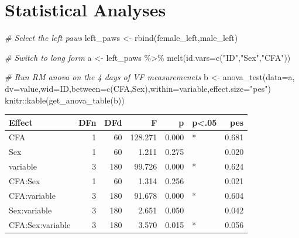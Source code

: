 \documentclass[
]{book}
\newenvironment{Shaded}{\begin{snugshade}}{\end{snugshade}}
\newcommand{\AttributeTok}[1]{\textcolor[rgb]{0.77,0.63,0.00}{#1}}
\newcommand{\CommentTok}[1]{\textcolor[rgb]{0.56,0.35,0.01}{\textit{#1}}}
\newcommand{\FunctionTok}[1]{\textcolor[rgb]{0.00,0.00,0.00}{#1}}
\newcommand{\NormalTok}[1]{#1}
\newcommand{\OtherTok}[1]{\textcolor[rgb]{0.56,0.35,0.01}{#1}}
\newcommand{\SpecialCharTok}[1]{\textcolor[rgb]{0.00,0.00,0.00}{#1}}
\newcommand{\StringTok}[1]{\textcolor[rgb]{0.31,0.60,0.02}{#1}}
\begin{document}
\hypertarget{statistical-analyses-2}{%
\section*{Statistical Analyses}\label{statistical-analyses-2}}

\begin{Shaded}
\begin{Highlighting}[]
\CommentTok{\# Select the left paws}
\NormalTok{left\_paws }\OtherTok{\textless{}{-}} \FunctionTok{rbind}\NormalTok{(female\_left,male\_left)}

\CommentTok{\# Switch to long form}
\NormalTok{a }\OtherTok{\textless{}{-}}\NormalTok{ left\_paws }\SpecialCharTok{\%\textgreater{}\%} 
  \FunctionTok{melt}\NormalTok{(}\AttributeTok{id.vars=}\FunctionTok{c}\NormalTok{(}\StringTok{"ID"}\NormalTok{,}\StringTok{"Sex"}\NormalTok{,}\StringTok{"CFA"}\NormalTok{))}

\CommentTok{\# Run RM anova on the 4 days of VF measuremenets}
\NormalTok{b }\OtherTok{\textless{}{-}} \FunctionTok{anova\_test}\NormalTok{(}\AttributeTok{data=}\NormalTok{a, }\AttributeTok{dv=}\NormalTok{value,}\AttributeTok{wid=}\NormalTok{ID,}\AttributeTok{between=}\FunctionTok{c}\NormalTok{(CFA,Sex),}\AttributeTok{within=}\NormalTok{variable,}\AttributeTok{effect.size=}\StringTok{"pes"}\NormalTok{)}
\NormalTok{knitr}\SpecialCharTok{::}\FunctionTok{kable}\NormalTok{(}\FunctionTok{get\_anova\_table}\NormalTok{(b))}
\end{Highlighting}
\end{Shaded}

\begin{tabular}{l|r|r|r|r|l|r}
\hline
Effect & DFn & DFd & F & p & p<.05 & pes\\
\hline
CFA & 1 & 60 & 128.271 & 0.000 & * & 0.681\\
\hline
Sex & 1 & 60 & 1.211 & 0.275 &  & 0.020\\
\hline
variable & 3 & 180 & 99.726 & 0.000 & * & 0.624\\
\hline
CFA:Sex & 1 & 60 & 1.314 & 0.256 &  & 0.021\\
\hline
CFA:variable & 3 & 180 & 91.678 & 0.000 & * & 0.604\\
\hline
Sex:variable & 3 & 180 & 2.651 & 0.050 &  & 0.042\\
\hline
CFA:Sex:variable & 3 & 180 & 3.570 & 0.015 & * & 0.056\\
\hline
\end{tabular}
\end{document}
